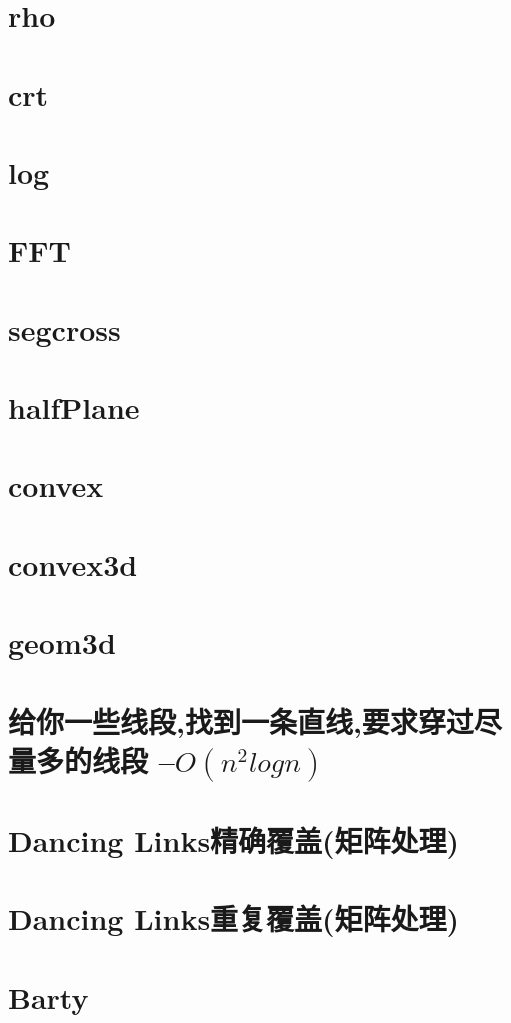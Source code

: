 \documentclass[
	10pt,
	twocolumn,
	a4paper,
]{article}
\begin{document}
\section{rho}

\section{crt}

\section{log}

\section{FFT}


\section{segcross}

\section{halfPlane}

\section{convex}

\section{convex3d}

\section{geom3d}

\section{给你一些线段,找到一条直线,要求穿过尽量多的线段 –$O(n^2logn)$}


%
\section{Dancing Links精确覆盖(矩阵处理)}

\section{Dancing Links重复覆盖(矩阵处理)}

\section{Barty}

%
\end{document}
